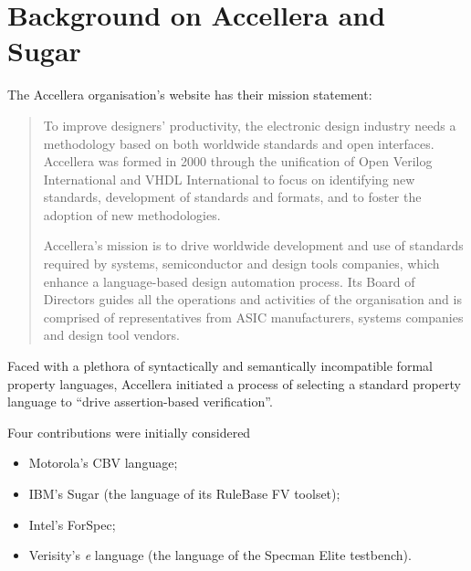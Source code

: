 \documentclass{llncs}
\begin{document}
\vspace*{-6mm}

\section{Background on Accellera and Sugar}

The Accellera organisation's website has their mission statement:

\vspace*{-1mm}

{\sl\begin{quote}

To improve designers' productivity, the electronic design industry
needs a methodology based on both worldwide standards and open
interfaces. Accellera was formed in 2000 through the unification of
Open Verilog International and VHDL International to focus on
identifying new standards, development of standards and formats, and
to foster the adoption of new methodologies.

Accellera's mission is to drive worldwide development and use of
standards required by systems, semiconductor and design tools
companies, which enhance a language-based design automation
process. Its Board of Directors guides all the operations and
activities of the organisation and is comprised of representatives
from ASIC manufacturers, systems companies and design tool vendors.
\end{quote}}

\vspace*{-1mm}

Faced with a plethora of syntactically and semantically incompatible
formal property languages, Accellera initiated a process of selecting
a standard property language to ``drive assertion-based verification''.

\newpage

Four contributions were initially considered

\vspace*{-3mm}

\begin{itemize}

\item Motorola's CBV language;

\item IBM's Sugar (the language of its RuleBase FV toolset);

\item Intel's ForSpec;

\item Verisity's {\it e} language (the language of the Specman Elite testbench).

\end{itemize}
\end{document}
